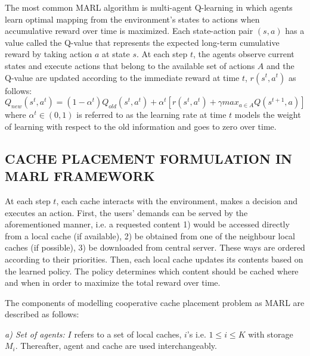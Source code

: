 \documentclass[journal,onecolumn]{IEEEtran}
\begin{document}
The most common MARL algorithm is multi-agent Q-learning in which agents learn optimal mapping from the environment's states to actions when accumulative reward over time is maximized. Each state-action pair $(s, a)$ has a value called the Q-value that represents the expected long-term cumulative reward by taking action $a$ at state $s$. At each step $t$, the agents observe current states and execute actions that belong to the available set of actions $A$ and the Q-value are updated according to the immediate reward at time $t$, $r(s^t,a^t)$ as follows:
\begin{equation}
Q_{new}(s^t,a^t) = (1-\alpha^t) Q_{old}(s^t,a^t)+\alpha^t [r(s^t,a^t) 
 + \gamma max_{a \in A} Q(s^{t+1}, a)]
\label{qlearning1}
\end{equation}
where $\alpha^t \in (0,1)$ is referred to as the learning rate at time $t$ models the weight of learning with respect to the old information and goes to zero over time.

\subsection{CACHE PLACEMENT FORMULATION IN MARL FRAMEWORK}

At each step $t$, each cache interacts with the environment, makes a decision and executes an action. First, the users' demands can be served by the aforementioned manner, i.e. a requested content 1) would be accessed directly from a local cache (if available), 2) be obtained from one of the neighbour local caches (if possible), 3) be downloaded from central server. These ways are ordered according to their priorities. Then, each local cache updates its contents based on the learned policy. The policy determines which content should be cached where and when in order to maximize the total reward over time. 

The components of modelling cooperative cache placement problem as MARL are described as follows:

\textit{a) Set of agents:} $I$ refers to a set of local caches, $i$'s i.e. $1 \leq i \leq K$ with storage $M_i$. Thereafter, agent and cache are used interchangeably.
\end{document}
